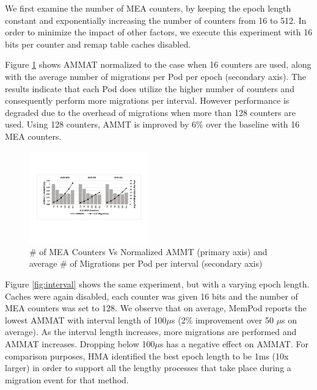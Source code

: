 

We first examine the number of MEA counters, by keeping the epoch length constant and exponentially increasing the number of counters from 16 to 512. In order to minimize the impact of other factors, we execute this experiment with 16 bits per counter and remap table caches disabled. 

Figure \ref{fig:num_counters} shows AMMAT normalized to the case when 16 counters are used, along with the average number of migrations per Pod per epoch (secondary axis). The results indicate that each Pod does utilize the higher number of counters and consequently perform more migrations per interval. However performance is degraded due to the overhead of migrations when more than 128 counters are used. Using 128 counters, AMMT is improved by 6\% over the baseline with 16 MEA counters. 

\begin{figure}[h]
	\centering
  \includegraphics[width=0.46\textwidth]{figures/avg_num_counters_normalized.pdf}
  \caption{\# of MEA Counters Vs Normalized AMMT (primary axis) and average \# of Migrations per Pod per interval (secondary axis)}
  \label{fig:num_counters}
\end{figure}

Figure \ref{fig:interval} shows the same experiment, but with a varying epoch length. Caches were again disabled, each counter was given 16 bits and the number of MEA counters was set to 128. We observe that on average, MemPod reports the lowest AMMAT with interval length of 100$\mu$s (2\% improvement over 50 $\mu$s on average). As the interval length increases, more migrations are performed and AMMAT increases. Dropping below 100$\mu$s has a negative effect on AMMAT. For comparison purposes, HMA \cite{meswani-HPCA21} identified the best epoch length to be 1ms (10x larger) in order to support all the lengthy processes that take place during a migration event for that method.

